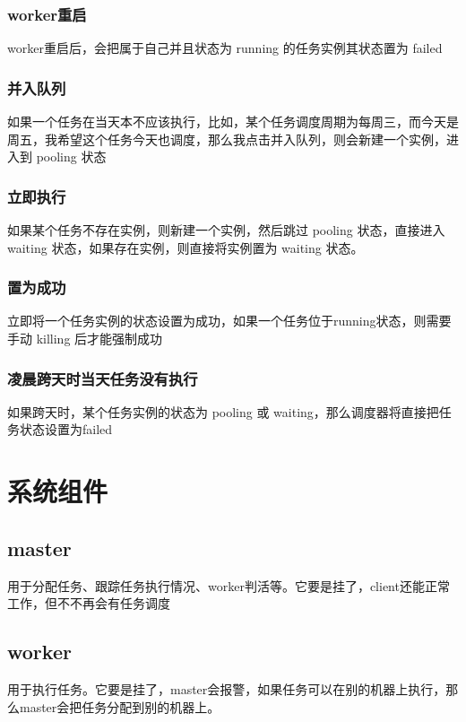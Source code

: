 ﻿\documentclass[a4paper]{report}
\begin{document}
\subsubsection{worker重启} %
worker重启后，会把属于自己并且状态为 running 的任务实例其状态置为 failed

\subsubsection{并入队列} %
如果一个任务在当天本不应该执行，比如，某个任务调度周期为每周三，而今天是周五，我希望这个任务今天也调度，那么我点击并入队列，则会新建一个实例，进入到 pooling 状态

\subsubsection{立即执行}
如果某个任务不存在实例，则新建一个实例，然后跳过 pooling 状态，直接进入 waiting 状态，如果存在实例，则直接将实例置为 waiting 状态。

\subsubsection{置为成功} %
立即将一个任务实例的状态设置为成功，如果一个任务位于running状态，则需要手动 killing 后才能强制成功


\subsubsection{凌晨跨天时当天任务没有执行} %
如果跨天时，某个任务实例的状态为 pooling 或 waiting，那么调度器将直接把任务状态设置为failed



\section{系统组件} %
\subsection{master}
用于分配任务、跟踪任务执行情况、worker判活等。它要是挂了，client还能正常工作，但不不再会有任务调度

\subsection{worker}
用于执行任务。它要是挂了，master会报警，如果任务可以在别的机器上执行，那么master会把任务分配到别的机器上。
\end{document}

